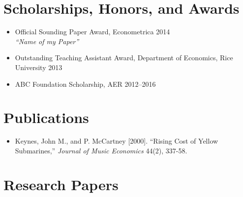 \documentclass{article}[12]
\begin{document}
\section{Scholarships, Honors, and Awards}

\begin{itemize}
    \item Official Sounding Paper Award, Econometrica \hfill 2014 \\
    \emph{``Name of my Paper''}
    
    \item Outstanding Teaching Assistant Award, Department of Economics, Rice University \hfill 2013

    \item ABC Foundation Scholarship, AER \hfill 2012--2016
\end{itemize}



\section{Publications}

\begin{itemize}
    \item Keynes, John M., and P. McCartney [2000]. ``Rising Cost of Yellow Submarines,'' \emph{Journal of Music Economics} 44(2), 337-58.
\end{itemize}


\section{Research Papers}
\end{document}
